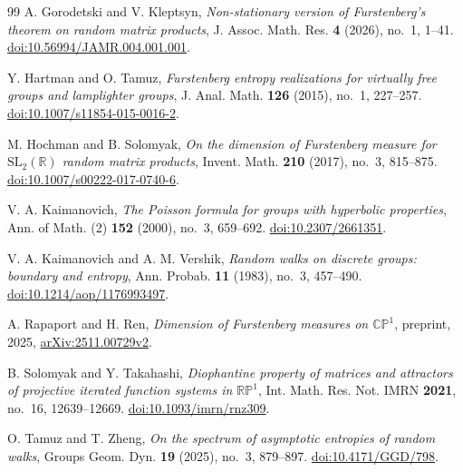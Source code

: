 \documentclass[11pt,letterpaper]{amsart}
\theoremstyle{definition}
\theoremstyle{remark}
\numberwithin{equation}{section}
\begin{document}
\begin{thebibliography}{99}
A. Gorodetski and V. Kleptsyn,
\emph{Non-stationary version of Furstenberg's theorem on random matrix products},
J. Assoc. Math. Res. \textbf{4} (2026), no.~1, 1--41.
\href{https://doi.org/10.56994/JAMR.004.001.001}{doi:10.56994/JAMR.004.001.001}.

Y. Hartman and O. Tamuz,
\emph{Furstenberg entropy realizations for virtually free groups and lamplighter groups},
J. Anal. Math. \textbf{126} (2015), no.~1, 227--257.
\href{https://doi.org/10.1007/s11854-015-0016-2}{doi:10.1007/s11854-015-0016-2}.

M. Hochman and B. Solomyak,
\emph{On the dimension of Furstenberg measure for
$\mathrm{SL}_2(\mathbb R)$ random matrix products},
Invent. Math. \textbf{210} (2017), no.~3, 815--875.
\href{https://doi.org/10.1007/s00222-017-0740-6}{doi:10.1007/s00222-017-0740-6}.

V. A. Kaimanovich,
\emph{The Poisson formula for groups with hyperbolic properties},
Ann. of Math. (2) \textbf{152} (2000), no.~3, 659--692.
\href{https://doi.org/10.2307/2661351}{doi:10.2307/2661351}.

V. A. Kaimanovich and A. M. Vershik,
\emph{Random walks on discrete groups: boundary and entropy},
Ann. Probab. \textbf{11} (1983), no.~3, 457--490.
\href{https://doi.org/10.1214/aop/1176993497}{doi:10.1214/aop/1176993497}.

A. Rapaport and H. Ren,
\emph{Dimension of Furstenberg measures on $\mathbb{CP}^1$},
preprint, 2025,
\href{https://arxiv.org/abs/2511.00729v2}{arXiv:2511.00729v2}.

B. Solomyak and Y. Takahashi,
\emph{Diophantine property of matrices and attractors of projective
iterated function systems in $\mathbb{RP}^1$},
Int. Math. Res. Not. IMRN \textbf{2021}, no.~16, 12639--12669.
\href{https://doi.org/10.1093/imrn/rnz309}{doi:10.1093/imrn/rnz309}.

O. Tamuz and T. Zheng,
\emph{On the spectrum of asymptotic entropies of random walks},
Groups Geom. Dyn. \textbf{19} (2025), no.~3, 879--897.
\href{https://doi.org/10.4171/GGD/798}{doi:10.4171/GGD/798}.

\end{thebibliography}
\end{document}
